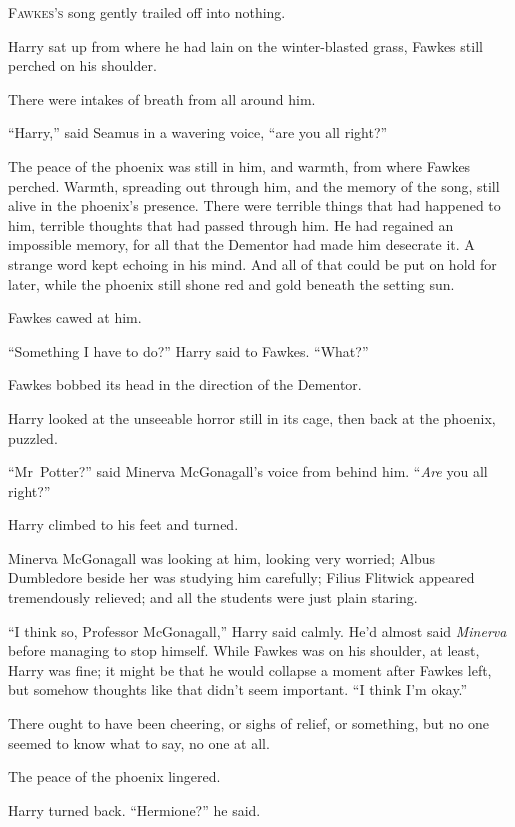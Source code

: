 
\lettrine{F}{awkes’s} song
gently trailed off into nothing.

\quad\quad
Harry sat up from where he had lain on the winter-blasted grass, Fawkes still perched on his shoulder.

There were intakes of breath from all around him.

“Harry,” said Seamus in a wavering voice, “are you all right?”

The peace of the phoenix was still in him, and warmth, from where Fawkes perched. Warmth, spreading out through him, and the memory of the song, still alive in the phoenix’s presence. There were terrible things that had happened to him, terrible thoughts that had passed through him. He had regained an impossible memory, for all that the Dementor had made him desecrate it. A strange word kept echoing in his mind. And all of that could be put on hold for later, while the phoenix still shone red and gold beneath the setting sun.

Fawkes cawed at him.

“Something I have to do?” Harry said to Fawkes. “What?”

Fawkes bobbed its head in the direction of the Dementor.

Harry looked at the unseeable horror still in its cage, then back at the phoenix, puzzled.

“Mr~Potter?” said Minerva McGonagall’s voice from behind him. “\emph{Are} you all right?”

Harry climbed to his feet and turned.

Minerva McGonagall was looking at him, looking very worried; Albus Dumbledore beside her was studying him carefully; Filius Flitwick appeared tremendously relieved; and all the students were just plain staring.

“I think so, Professor McGonagall,” Harry said calmly. He’d almost said \emph{Minerva} before managing to stop himself. While Fawkes was on his shoulder, at least, Harry was fine; it might be that he would collapse a moment after Fawkes left, but somehow thoughts like that didn’t seem important. “I think I’m okay.”

There ought to have been cheering, or sighs of relief, or something, but no one seemed to know what to say, no one at all.

The peace of the phoenix lingered.

Harry turned back. “Hermione?” he said.

